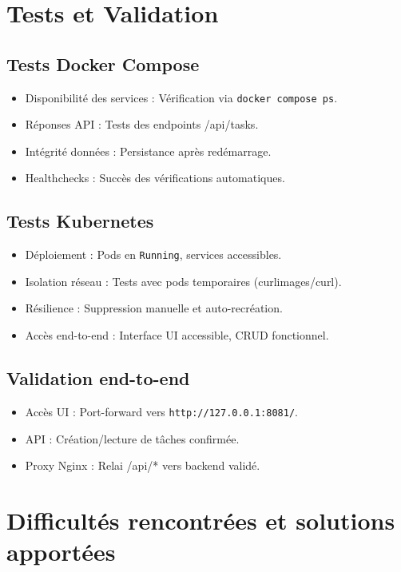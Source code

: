 \documentclass[11pt,a4paper,oneside]{report}
\begin{document}
\chapter{Tests et Validation}

\section{Tests Docker Compose}
\begin{itemize}
\item Disponibilité des services : Vérification via \texttt{docker compose ps}.
\item Réponses API : Tests des endpoints /api/tasks.
\item Intégrité données : Persistance après redémarrage.
\item Healthchecks : Succès des vérifications automatiques.
\end{itemize}

\section{Tests Kubernetes}
\begin{itemize}
\item Déploiement : Pods en \texttt{Running}, services accessibles.
\item Isolation réseau : Tests avec pods temporaires (curlimages/curl).
\item Résilience : Suppression manuelle et auto-recréation.
\item Accès end-to-end : Interface UI accessible, CRUD fonctionnel.
\end{itemize}

\section{Validation end-to-end}
\begin{itemize}
\item Accès UI : Port-forward vers \texttt{http://127.0.0.1:8081/}.
\item API : Création/lecture de tâches confirmée.
\item Proxy Nginx : Relai /api/* vers backend validé.
\end{itemize}

\chapter{Difficultés rencontrées et solutions apportées}
\end{document}
